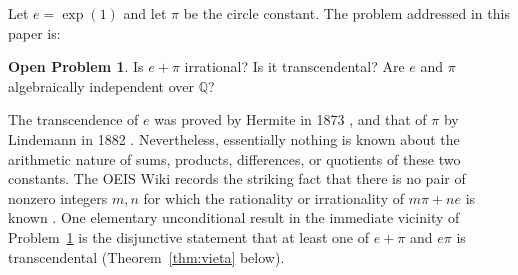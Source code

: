 \documentclass[11pt]{amsart}
\theoremstyle{definition}
\newtheorem{problem}[theorem]{Open Problem}
\theoremstyle{remark}
\numberwithin{equation}{section}
\newcommand{\Q}{\mathbb{Q}}
\newcommand{\ee}{e}
\begin{document}
Let $\ee=\exp(1)$ and let $\pi$ be the circle constant. The problem addressed in this paper is:

\begin{problem}\label{prob:main}
Is $e+\pi$ irrational? Is it transcendental? Are $e$ and $\pi$ algebraically independent over $\Q$?
\end{problem}

The transcendence of $\ee$ was proved by Hermite in 1873 \cite{Hermite1873}, and that of $\pi$ by Lindemann in 1882 \cite{Lindemann1882}. Nevertheless, essentially nothing is known about the arithmetic nature of sums, products, differences, or quotients of these two constants. The OEIS Wiki records the striking fact that there is no pair of nonzero integers $m,n$ for which the rationality or irrationality of $m\pi+n\ee$ is known \cite{OEIS}. One elementary unconditional result in the immediate vicinity of Problem~\ref{prob:main} is the disjunctive statement that at least one of $e+\pi$ and $e\pi$ is transcendental (Theorem~\ref{thm:vieta} below).
\end{document}
